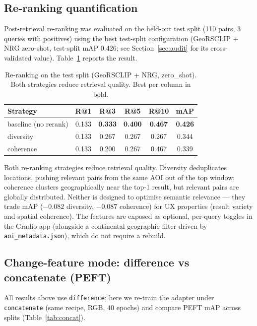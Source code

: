 \documentclass{article}
\begin{document}
\subsection{Re-ranking quantification}
\label{sec:rerank}

Post-retrieval re-ranking was evaluated on the held-out test split (110 pairs,
3 queries with positives) using the best test-split configuration
(GeoRSCLIP + NRG zero-shot, test-split mAP 0.426; see Section~\ref{sec:audit} for
its cross-validated value). Table~\ref{tab:rerank} reports the result.

\begin{table}[H]
    \centering
    \caption{Re-ranking on the test split (GeoRSCLIP + NRG, zero\_shot). Both
    strategies reduce retrieval quality. Best per column in bold.}
    \label{tab:rerank}
    \begin{tabular}{lccccc}
        \toprule
        \textbf{Strategy} & \textbf{R@1} & \textbf{R@3} & \textbf{R@5} & \textbf{R@10} & \textbf{mAP} \\
        \midrule
        baseline (no rerank) & 0.133 & \textbf{0.333} & \textbf{0.400} & \textbf{0.467} & \textbf{0.426} \\
        diversity            & 0.133 & 0.267 & 0.267 & 0.267 & 0.344 \\
        coherence            & 0.133 & 0.200 & 0.267 & 0.467 & 0.339 \\
        \bottomrule
    \end{tabular}
\end{table}

Both re-ranking strategies reduce retrieval quality. Diversity
deduplicates locations, pushing relevant pairs from the same AOI out of the
top window; coherence clusters geographically near the top-1 result, but
relevant pairs are globally distributed. Neither is designed to optimise
semantic relevance --- they trade mAP ($-0.082$ diversity, $-0.087$ coherence)
for UX properties (result variety and spatial coherence). The features are exposed as optional,
per-query toggles in the Gradio app (alongside a continental geographic filter
driven by \texttt{aoi\_metadata.json}), which do not require a rebuild.

\subsection{Change-feature mode: difference vs concatenate (PEFT)}
\label{sec:concat}

All results above use \texttt{difference}; here we re-train the adapter under
\texttt{concatenate} (same recipe, RGB, 40 epochs) and compare PEFT mAP across
splits (Table~\ref{tab:concat}).
\end{document}

